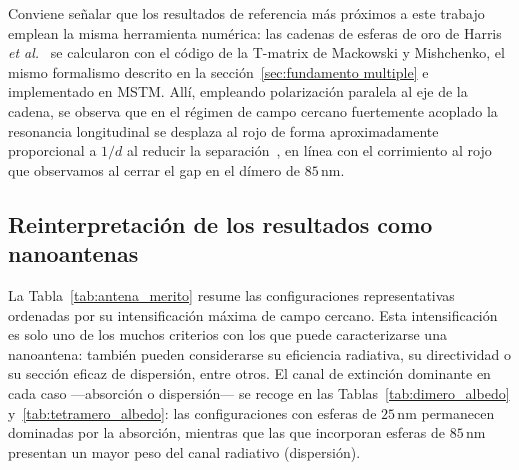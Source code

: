 Conviene señalar que los resultados de referencia más próximos a este trabajo
emplean la misma herramienta numérica: las cadenas de esferas de oro de
Harris \textit{et al.}~\cite{Harris2009} se calcularon con el código de la T-matrix de
Mackowski y Mishchenko, 
el mismo formalismo descrito en la
sección~\ref{sec:fundamento multiple} e implementado en MSTM. Allí, empleando
polarización paralela al eje de la cadena, se observa que en el régimen de
campo cercano fuertemente acoplado la resonancia longitudinal se desplaza al
rojo de forma aproximadamente proporcional a $1/d$ al reducir la
separación~\cite{Harris2009}, en línea con el corrimiento al rojo que
observamos al cerrar el gap en el dímero de $85\,\text{nm}$.

\subsection{Reinterpretación de los resultados como nanoantenas}
\label{subsec:reinterpretacion}

La Tabla~\ref{tab:antena_merito} resume las configuraciones representativas
ordenadas por su intensificación máxima de campo cercano. Esta intensificación
es solo uno de los muchos criterios con los que puede caracterizarse una
nanoantena: también pueden considerarse su eficiencia radiativa, su
directividad o su sección eficaz de dispersión, entre otros. El canal de
extinción dominante en cada caso —absorción o dispersión— se recoge en las
Tablas~\ref{tab:dimero_albedo} y~\ref{tab:tetramero_albedo}: las
configuraciones con esferas de $25\,\text{nm}$ permanecen dominadas por la
absorción, mientras que las que incorporan esferas de $85\,\text{nm}$
presentan un mayor peso del canal radiativo (dispersión).
 
